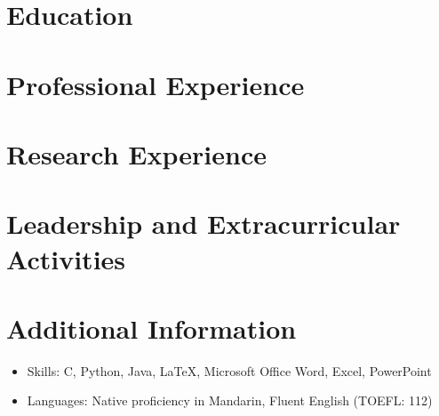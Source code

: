 \documentclass{resumeEN}
\begin{document}
\section{Education}

\thuundergrad
\umnexchange

\section{Professional Experience}

\continental
\summitview

\section{Research Experience}

\fifaresearch

\section{Leadership and Extracurricular Activities}

\eydatascience

\section{Additional Information}

\vspace{0.618ex}
\begin{itemize}
\item Skills: C, Python, Java, {\LaTeX}, Microsoft Office Word, Excel, PowerPoint
\item Languages: Native proficiency in Mandarin, Fluent English (TOEFL: 112)
\end{itemize}
\end{document}
